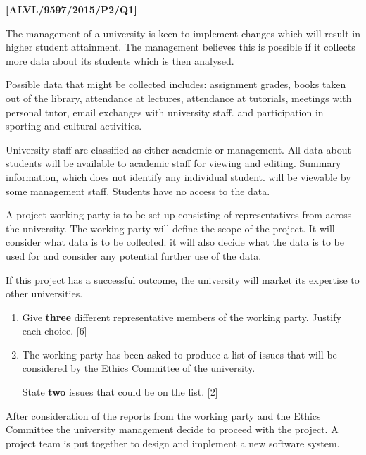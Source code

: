 \item \textbf{{[}ALVL/9597/2015/P2/Q1{]} }

The management of a university is keen to implement changes which
will result in higher student attainment. The management believes
this is possible if it collects more data about its students which
is then analysed.

Possible data that might be collected includes: assignment grades,
books taken out of the library, attendance at lectures, attendance
at tutorials, meetings with personal tutor, email exchanges with university
staff. and participation in sporting and cultural activities.

University staff are classified as either academic or management.
All data about students will be available to academic staff for viewing
and editing. Summary information, which does not identify any individual
student. will be viewable by some management staff. Students have
no access to the data.

A project working party is to be set up consisting of representatives
from across the university. The working party will define the scope
of the project. It will consider what data is to be collected. it
will also decide what the data is to be used for and consider any
potential further use of the data.

If this project has a successful outcome, the university will market
its expertise to other universities. 
\begin{enumerate}
\item Give \textbf{three} different representative members of the working
party. Justify each choice. \hfill{}{[}6{]}
\item The working party has been asked to produce a list of issues that
will be considered by the Ethics Committee of the university.

State \textbf{two} issues that could be on the list.\hfill{} {[}2{]}
\end{enumerate}
After consideration of the reports from the working party and the
Ethics Committee the university management decide to proceed with
the project. A project team is put together to design and implement
a new software system.

